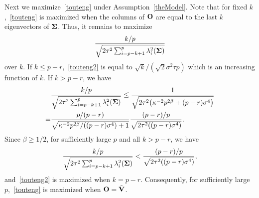 \documentclass[3p]{elsarticle}
\theoremstyle{plain}
\theoremstyle{definition}
\theoremstyle{remark}
\begin{document}
Next we maximize~\eqref{touteng} under Assumption~\ref{theModel}. Note that for fixed $k$,~\eqref{touteng} is maximized when the columns of $\mathbf{O}$ are equal to the last $k$ eigenvectors of $\boldsymbol{\Sigma}$.
Thus, it remains to maximize
\begin{equation}\label{touteng2}
\frac{k/p}{\sqrt{2\tau^2\sum_{i=p-k+1}^p \lambda_i^2 (\boldsymbol{\Sigma})}}
\end{equation}
over $k$.
If $k\leq p-r$,~\eqref{touteng2} is equal to $\sqrt{k}/(\sqrt{2} \sigma^2 \tau p)$ which is an increasing function of $k$.
If $k> p-r$, we have
\begin{equation*}
    \begin{aligned}
        &\frac{k/p}{\sqrt{2\tau^2\sum_{i=p-k+1}^p \lambda_i^2(\boldsymbol{\Sigma})}}
        \leq
        \frac{1}{\sqrt{2\tau^2\big(\kappa^{-2}p^{2\beta}+(p-r)\sigma^4\big)}}\\
        =&
        \frac{p/(p-r)}{\sqrt{\kappa^{-2}p^{2\beta}/((p-r)\sigma^4)+1}}
\frac{(p-r)/p}{\sqrt{2\tau^2((p-r)\sigma^4)}}.
    \end{aligned}
\end{equation*}
Since $\beta\geq 1/2$, for sufficiently large $p$ and all $k>p-r$, we have
\begin{equation*}
    \begin{aligned}
        \frac{k/p}{\sqrt{2\tau^2\sum_{i=p-k+1}^p \lambda_i^2(\boldsymbol{\Sigma})}}
        <
\frac{(p-r)/p}{\sqrt{2\tau^2((p-r)\sigma^4)}},
    \end{aligned}
\end{equation*}
and~\eqref{touteng2} is maximized when $k=p-r$.
Consequently, for sufficiently large $p$,~\eqref{touteng} is maximized when $\mathbf{O}=\tilde{\mathbf{V}}$.
\end{document}

